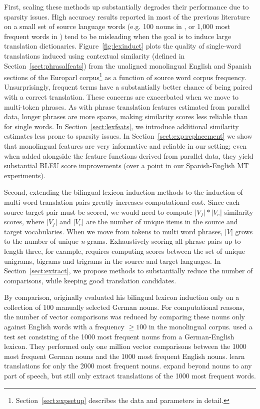 \documentclass[11pt]{article}
\newcommand{\secref}[1]{Section~\ref{#1}}
\newcommand{\figref}[1]{Figure~\ref{#1}}
\begin{document}
First, scaling these methods up substantially degrades their performance due to sparsity issues. High accuracy results reported in most of the previous literature on a small set of source language words (e.g. 100 nouns in , or 1,000 most frequent words in ) tend to be misleading when the goal is to induce large translation dictionaries. \figref{fig:lexinduct} plots the quality of single-word translations induced using contextual similarity (defined in \secref{sect:phrasalfeats}) from the unaligned monolingual English and Spanish sections of the Europarl corpus\footnote{\secref{sect:expsetup} describes the data and parameters in detail.} as a function of source word corpus frequency. Unsurprisingly, frequent terms have a substantially better chance of being paired with a correct translation.  These concerns are exacerbated when we move to multi-token phrases.  As with phrase translation features estimated from parallel data, longer phrases are more sparse, making similarity scores less reliable than for single words.  In \secref{sect:lexfeats}, we introduce additional similarity estimates less prone to sparsity issues.  In \secref{sect:exp:replacement} we show that monolingual features are very informative and reliable in our setting; even when added alongside the feature functions derived from parallel data, they yield substantial BLEU score improvements (over a point in our Spanish-English MT experiments). %

Second, extending the bilingual lexicon induction methods to the induction of multi-word translation pairs greatly increases computational cost. Since each source-target pair must be scored, we would need to compute $|V_{f}| * |V_{e}|$ similarity scores, where $|V_{f}|$ and $|V_{e}|$ are the number of unique items in the source and target vocabularies. When we move from tokens to multi word phrases, $|V|$ grows to the number of unique {\it n}-grams. Exhaustively scoring all phrase pairs up to length three, for example, requires computing scores between the set of unique unigrams, bigrams and trigrams in the source and target languages.  In \secref{sect:extract}, we propose methods to substantially reduce the number of comparisons, while keeping good translation candidates.

By comparison,  originally evaluated his bilingual lexicon induction only on a collection of 100 manually selected German nouns.  For computational reasons, the number of vector comparisons was reduced by comparing these nouns only against English words with a frequency $\geq100$ in the monolingual corpus.
 used a test set consisting of the 1000 most frequent nouns from a German-English lexicon.  They performed only one million vector comparisons between the 1000 most frequent German nouns and the 1000 most frequent English nouns.
 learn translations for only the 2000 most frequent nouns.    expand beyond nouns to any part of speech, but still only extract translations of the 1000 most frequent words.
\end{document}
